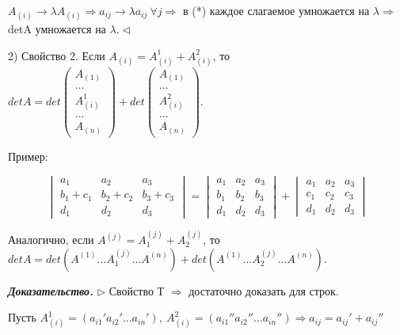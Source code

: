 $A_{(i)} \rightarrow \lambda A_{(i)} \Rightarrow a_{ij} \rightarrow \lambda a_{ij} \ \forall j \Rightarrow $ в (*) каждое слагаемое умножается на $\lambda \Rightarrow$ detA умножается на $\lambda. \lhd$

\vspace{\baselineskip}
2) Свойство 2. Если $A_{(i)} = A_{(i)}^1 + A_{(i)}^2$, то $detA = det \begin{pmatrix} A_{(1)} \\ \dots \\ A_{(i)}^1 \\ \dots \\ A_{(n)} \end{pmatrix} + det \begin{pmatrix} A_{(1)} \\ \dots \\ A_{(i)}^2 \\ \dots \\ A_{(n)} \end{pmatrix}$.

\vspace{\baselineskip}
Пример:

\[ \begin{vmatrix} a_1 & a_2 & a_3 \\ b_1 + c_1 & b_2 + c_2 & b_3 + c_3 \\ d_1 & d_2 & d_3 \end{vmatrix} = \begin{vmatrix} a_1 & a_2 & a_3 \\ b_1 & b_2 & b_3 \\ d_1 & d_2 & d_3 \end{vmatrix} + \begin{vmatrix} a_1 & a_2 & a_3 \\ c_1 & c_2 & c_3 \\ d_1 & d_2 & d_3 \end{vmatrix}
\]

\vspace{\baselineskip}
Аналогично, если $A^{(j)} = A^{(j)}_1 + A^{(j)}_2$, то $detA = det ( A^{(1)} \dots A^{(j)}_1 \dots A^{(n)} ) + det ( A^{(1)} \dots A^{(j)}_2 \dots A^{(n)})$.

\vspace{\baselineskip}
\textbf{\textit{Доказательство.}} $\rhd$ Свойство Т $\Rightarrow$ достаточно доказать для строк.

Пусть $A_{(i)}^1 = (a_{i1}' a_{i2}' \dots a_{in}'), \ A_{(i)}^2 = (a_{i1}'' a_{i2}'' \dots a_{in}'') \Rightarrow a_{ij} = a_{ij}' + a_{ij}''$

